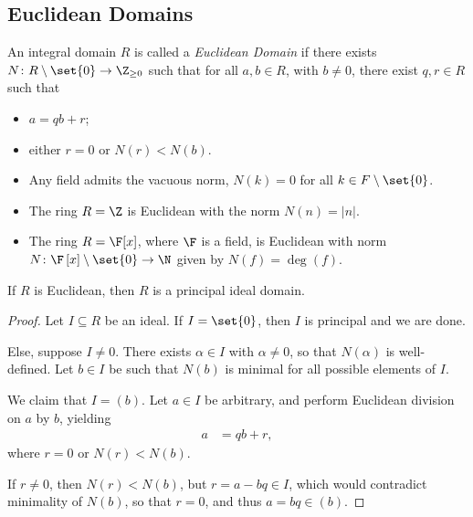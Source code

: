 \documentclass[10pt]{mypackage}
\begin{document}
\subsection{Euclidean Domains}%
\begin{definition}
  An integral domain $R$ is called a \textit{Euclidean Domain} if there exists $N\colon R\setminus \set{0}\rightarrow \Z_{\geq 0}$ such that for all $a,b\in R$, with $b\neq 0$, there exist $q,r\in R$ such that
  \begin{itemize}
    \item $a = qb + r$;
    \item either $r = 0$ or $N(r) < N(b)$.
  \end{itemize}
\end{definition}
\begin{example}\hfill
  \begin{itemize}
    \item Any field admits the vacuous norm, $N(k) = 0$ for all $k\in F\setminus \set{0}$.
    \item The ring $R = \Z$ is Euclidean with the norm $N(n) = \left\vert n \right\vert$. 
    \item The ring $R = \F[x]$, where $\F$ is a field, is Euclidean with norm $N\colon \F\left[ x \right]\setminus \set{0}\rightarrow \N$ given by $N(f) = \deg(f)$.
  \end{itemize}
\end{example}
\begin{theorem}
  If $R$ is Euclidean, then $R$ is a principal ideal domain.
\end{theorem}
\begin{proof}
  Let $I\subseteq R$ be an ideal. If $I = \set{0}$, then $I$ is principal and we are done.\newline

  Else, suppose $I\neq 0$. There exists $\alpha\in I$ with $\alpha\neq 0$, so that $N(\alpha)$ is well-defined. Let $b\in I$ be such that $N(b)$ is minimal for all possible elements of $I$.\newline

  We claim that $I = \left( b \right)$. Let $a\in I$ be arbitrary, and perform Euclidean division on $a$ by $b$, yielding
  \begin{align*}
    a &= qb + r,
  \end{align*}
  where $r = 0$ or $N(r) < N(b)$.\newline

  If $r\neq 0$, then $N(r) < N(b)$, but $r = a - bq\in I$, which would contradict minimality of $N(b)$, so that $r = 0$, and thus $a = bq\in \left( b \right)$.
\end{proof}
\end{document}

